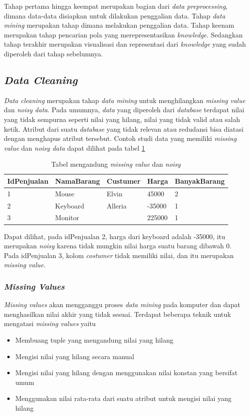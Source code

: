 Tahap pertama hingga keempat merupakan bagian dari \textsl{data preprocessing}, dimana data-data disiapkan untuk dilakukan penggalian data. Tahap \textsl{data mining} merupakan tahap dimana melakukan penggalian data. Tahap keenam merupakan tahap pencarian pola yang merepresentasikan \textsl{knowledge}. Sedangkan tahap terakhir merupakan visualisasi dan representasi dari \textsl{knowledge} yang sudah diperoleh dari tahap sebelumnya.


\subsection{\textsl{Data Cleaning}}
\textsl{Data cleaning} merupakan tahap \textsl{data mining} untuk menghilangkan \textsl{missing value} dan \textsl{noisy data}. Pada umumnya, \textsl{data} yang diperoleh dari \textsl{database} terdapat nilai yang tidak sempurna seperti nilai yang hilang, nilai yang tidak valid atau salah ketik. Atribut dari suatu \textsl{database} yang tidak relevan atau redudansi bisa diatasi dengan menghapus atribut tersebut. Contoh studi data yang memiliki \textsl{missing value} dan \textsl{noisy data} dapat dilihat pada tabel \ref{table:contohMissingNNoisy}

\begin{table}[h]
\caption{Tabel mengandung \textsl{missing value} dan \textsl{noisy}}
\label{table:contohMissingNNoisy}
\begin{tabular}{|l|l|l|l|l|}
\hline
IdPenjualan & NamaBarang & Custumer & Harga  & BanyakBarang \\ \hline
1           & Mouse      & Elvin    & 45000  & 2            \\ \hline
2           & Keyboard   & Alleria  & -35000 & 1            \\ \hline
3           & Monitor    &          & 225000 & 1            \\ \hline
\end{tabular}
\end{table}

Dapat dilihat, pada idPenjualan 2, harga dari keyboard adalah -35000, itu merupakan \textsl{noisy} karena tidak mungkin nilai harga suatu barang dibawah 0. Pada idPenjualan 3, kolom \textsl{costumer} tidak memiliki nilai, dan itu merupakan \textsl{missing value}.

\subsubsection{\textsl{Missing Values}}
\textsl{Missing values} akan mengganggu proses \textsl{data mining} pada komputer dan dapat menghasilkan nilai akhir yang tidak sesuai. Terdapat beberapa teknik untuk mengatasi \textsl{missing values} yaitu
	\begin{itemize}
		\item Membuang tuple yang mengandung nilai yang hilang\textit{\textit{}}
		\item Mengisi nilai yang hilang secara manual
		\item Mengisi nilai yang hilang dengan menggunakan nilai konstan yang bersifat umum
		\item Menggunakan nilai rata-rata dari suatu atribut untuk mengisi nilai yang hilang
	\end{itemize}
